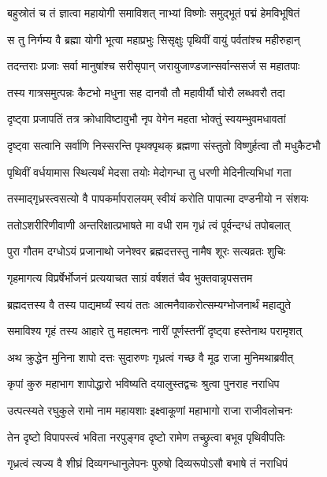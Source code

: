 \twolineshloka
{बहुस्रोतं च तं ज्ञात्वा महायोगी समाविशत्}
{नाभ्यां विष्णोः समुद्भूतं पद्मं हेमविभूषितं}%

\twolineshloka
{स तु निर्गम्य वै ब्रह्मा योगी भूत्वा महाप्रभुः}
{सिसृक्षुः पृथिवीं वायुं पर्वतांश्च महीरुहान्}%

\twolineshloka
{तदन्तराः प्रजाः सर्वा मानुषांश्च सरीसृपान्}
{जरायुजाण्डजान्सर्वान्ससर्ज स महातपाः}%

\twolineshloka
{तस्य गात्रसमुत्पन्नः कैटभो मधुना सह}
{दानवौ तौ महावीर्यौ घोरौ लब्धवरौ तदा}%

\twolineshloka
{दृष्ट्वा प्रजापतिं तत्र क्रोधाविष्टावुभौ नृप}
{वेगेन महता भोक्तुं स्वयम्भुवमधावतां}%

\twolineshloka
{दृष्ट्वा सत्वानि सर्वाणि निस्सरन्ति पृथक्पृथक्}
{ब्रह्मणा संस्तुतो विष्णुर्हत्वा तौ मधुकैटभौ}%

\twolineshloka
{पृथिवीं वर्धयामास स्थित्यर्थं मेदसा तयोः}
{मेदोगन्धा तु धरणी मेदिनीत्यभिधां गता}%

\twolineshloka
{तस्माद्गृध्रस्त्वसत्यो वै पापकर्मापरालयम्}
{स्वीयं करोति पापात्मा दण्डनीयो न संशयः}%

\twolineshloka
{ततोऽशरीरिणीवाणी अन्तरिक्षात्प्रभाषते}
{मा वधी राम गृध्रं त्वं पूर्वन्दग्धं तपोबलात्}%

\twolineshloka
{पुरा गौतम दग्धोऽयं प्रजानाथो जनेश्वर}
{ब्रह्मदत्तस्तु नामैष शूरः सत्यव्रतः शुचिः}%

\twolineshloka
{गृहमागत्य विप्रर्षेर्भोजनं प्रत्ययाचत}
{साग्रं वर्षशतं चैव भुक्तवान्नृपसत्तम}%

\twolineshloka
{ब्रह्मदत्तस्य वै तस्य पाद्यमर्घ्यं स्वयं ततः}
{आत्मनैवाकरोत्सम्यग्भोजनार्थं महाद्युते}%

\twolineshloka
{समाविश्य गृहं तस्य आहारे तु महात्मनः}
{नारीं पूर्णस्तनीं दृष्ट्वा हस्तेनाथ परामृशत्}%

\twolineshloka
{अथ क्रुद्धेन मुनिना शापो दत्तः सुदारुणः}
{गृध्रत्वं गच्छ वै मूढ राजा मुनिमथाब्रवीत्}%

\twolineshloka
{कृपां कुरु महाभाग शापोद्धारो भविष्यति}
{दयालुस्तद्वचः श्रुत्वा पुनराह नराधिप}%

\twolineshloka
{उत्पत्स्यते रघुकुले रामो नाम महायशाः}
{इक्ष्वाकूणां महाभागो राजा राजीवलोचनः}%

\twolineshloka
{तेन दृष्टो विपापस्त्वं भविता नरपुङ्गव}
{दृष्टो रामेण तच्छ्रुत्वा बभूव पृथिवीपतिः}%

\twolineshloka
{गृध्रत्वं त्यज्य वै शीघ्रं दिव्यगन्धानुलेपनः}
{पुरुषो दिव्यरूपोऽसौ बभाषे तं नराधिपं}%


